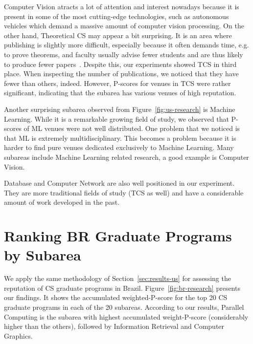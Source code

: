 \documentclass[msc]{ppgccufmg}
\begin{document}
Computer Vision atracts a lot of attention and interest nowadays because it is present in some of the most cutting-edge technologies, such as autonomous vehicles which demand a massive amount of computer vision processing. On the other hand, Theoretical CS may appear a bit surprising. It is an area where publishing is slightly more difficult, especially because it often demands time, e.g. to prove theorems, and faculty usually advise fewer students and are thus likely to produce fewer papers~\citep{wainer13}. Despite this, our experiments showed TCS in third place. When inspecting the number of publications, we noticed that they have fewer than others, indeed. However, P-scores for venues in TCS were rather significant, indicating that the subarea has various venues of high reputation.

Another surprising subarea observed from Figure~\ref{fig:us-research} is Machine Learning. While it is a remarkable growing field of study, we observed that P-scores of ML venues were not well distributed. One problem that we noticed is that ML is extremely multidisciplinary. This becomes a problem because it is harder to find pure venues dedicated exclusively to Machine Learning. Many subareas include Machine Learning related research, a good example is Computer Vision.

Database and Computer Network are also well positioned in our experiment. They are more traditional fields of study (TCS as well) and have a considerable amount of work developed in the past. 

\section{Ranking BR Graduate Programs by Subarea}\label{sec:results-br}

We apply the same methodology of Section~\ref{sec:results-us} for assessing the reputation of CS graduate programs in Brazil. Figure~\ref{fig:br-research} presents our findings. It shows the accumulated weighted-P-score for the top 20 CS graduate programs in each of the 20 subareas. According to our results, Parallel Computing is the subarea with highest accumulated weight-P-score (considerably higher than the others), followed by Information Retrieval and Computer Graphics.
\end{document}
